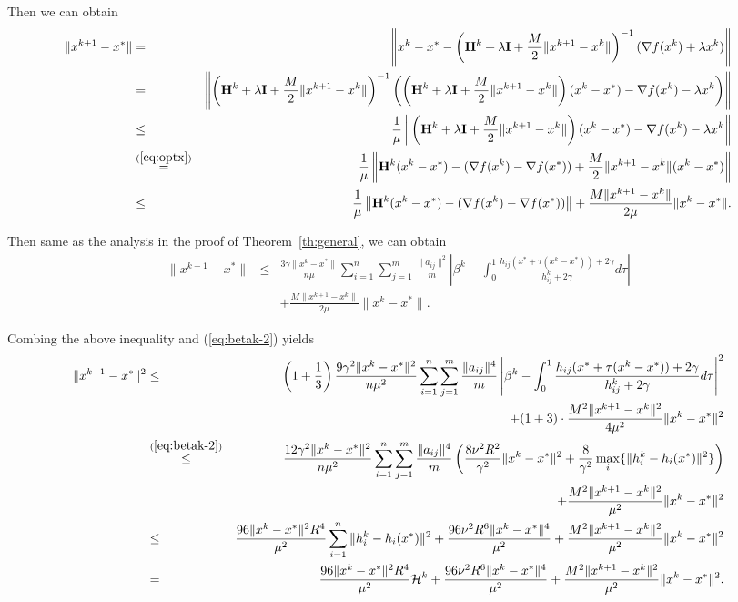 \documentclass[12pt]{article}
\newcommand{\newalpha}{h}
\newcommand{\mH}{\mathbf{H}}
\newcommand{\mI}{\mathbf{I}}
\begin{document}
Then we can obtain 
\begin{eqnarray*}
	\|x^{k+1} - x^*\| &=& \left \| x^k - x^* - \left(\mH^k + \lambda \mI +  \frac{M}{2}\|x^{k+1} - x^k\| \right)^{-1} (\nabla f(x^k) + \lambda x^k) \right\| \\
	&=& \left\| \left(\mH^k + \lambda \mI + \frac{M}{2}\|x^{k+1} - x^k\| \right)^{-1} \left(  \left( \mH^k + \lambda \mI + \frac{M}{2}\|x^{k+1} - x^k\| \right) (x^k - x^*) - \nabla f(x^k) - \lambda x^k  \right) \right\| \\ 
	&\leq& \frac{1}{\mu}  \left\|  \left(\mH^k + \lambda \mI +  \frac{M}{2}\|x^{k+1} - x^k\| \right)(x^k - x^*) - \nabla f(x^k) - \lambda x^k  \right \| \\ 
	&\overset{(\ref{eq:optx})}{=}& \frac{1}{\mu} \left\| \mH^k (x^k - x^*) - (\nabla f(x^k) - \nabla f(x^*)) +  \frac{M}{2}\|x^{k+1} - x^k\|(x^k - x^*) \right\| \\ 
	&\leq& \frac{1}{\mu} \left\| \mH^k (x^k - x^*) - (\nabla f(x^k) - \nabla f(x^*)) \right\|  + \frac{M\|x^{k+1} - x^k\|}{2\mu} \| x^k - x^* \|. 
\end{eqnarray*}

Then same as the analysis in the proof of Theorem~\ref{th:general}, we can obtain 
\begin{eqnarray*}
	\|x^{k+1} - x^*\| &\leq& \frac{3\gamma\|x^k - x^*\|}{n \mu} \sum_{i=1}^n \sum_{j=1}^{m} \frac{\|a_{ij}\|^2}{m} \left|   \beta^k - \int_{0}^1 \frac{\newalpha_{ij}(x^* + \tau(x^k - x^*)) + 2\gamma}{ h_{ij}^k + 2\gamma} d\tau   \right| \\ 
	&& +  \frac{M\|x^{k+1} - x^k\|}{2\mu} \| x^k - x^* \|.
\end{eqnarray*}

Combing the above inequality and (\ref{eq:betak-2}) yields 
\begin{eqnarray*}
	\|x^{k+1} - x^*\|^2 &\leq& \left(  1 + \frac{1}{3}  \right) \frac{9\gamma^2 \|x^k - x^*\|^2}{n \mu^2} \sum_{i=1}^n \sum_{j=1}^{m} \frac{\|a_{ij}\|^4}{m} \left|   \beta^k - \int_{0}^1 \frac{\newalpha_{ij}(x^* + \tau(x^k - x^*)) + 2\gamma}{ h_{ij}^k + 2\gamma} d\tau   \right|^2 \\
	&& + (1 + 3) \cdot \frac{M^2\|x^{k+1} - x^k\|^2}{4\mu^2} \| x^k - x^* \|^2 \\
	&\overset{(\ref{eq:betak-2})}{\leq}& \frac{12 \gamma^2\|x^k - x^*\|^2}{n \mu^2} \sum_{i=1}^n \sum_{j=1}^{m} \frac{\|a_{ij}\|^4}{m} \left(  \frac{8\nu^2 R^2}{\gamma^2} \|x^k - x^*\|^2 + \frac{8}{\gamma^2} \max_{i} \{\|h_i^k - \newalpha_i(x^*)\|^2 \}    \right) \\ 
	&& +  \frac{M^2\|x^{k+1} - x^k\|^2}{\mu^2} \| x^k - x^* \|^2 \\ 
	&\leq&  \frac{96\|x^k - x^*\|^2 R^4}{\mu^2} \sum_{i=1}^n \|h_i^k - \newalpha_i(x^*)\|^2 +   \frac{96\nu^2 R^6\|x^k - x^*\|^4 }{\mu^2} +  \frac{M^2\|x^{k+1} - x^k\|^2}{\mu^2} \| x^k - x^* \|^2 \\ 
	&=&  \frac{96\|x^k - x^*\|^2 R^4}{\mu^2}{\cal H}^k  +   \frac{96\nu^2 R^6\|x^k - x^*\|^4 }{\mu^2} +  \frac{M^2\|x^{k+1} - x^k\|^2}{\mu^2} \| x^k - x^* \|^2. 
\end{eqnarray*}
\end{document}
